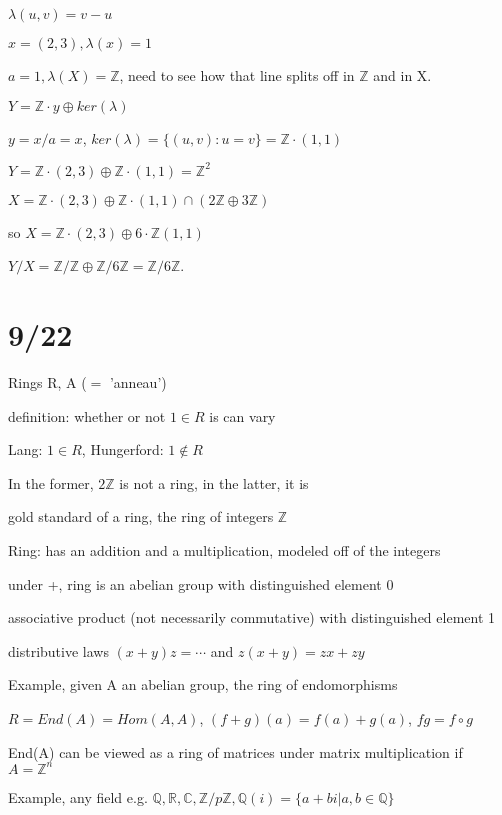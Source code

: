\documentclass[12pt]{article}
\begin{document}
$\lambda(u, v) = v - u$

$x = (2, 3), \lambda(x) = 1$

$a = 1, \lambda(X) = \mathds{Z}$, need to see how that line splits off in $\mathds{Z}$ and in X.

$Y = \mathds{Z}\cdot y \oplus ker(\lambda)$

$y = x/a = x$, $ker(\lambda) = \{(u, v) : u = v\} = \mathds{Z} \cdot (1, 1)$

$Y = \mathds{Z} \cdot (2, 3) \oplus \mathds{Z} \cdot (1, 1) = \mathds{Z}^2$

$X = \mathds{Z} \cdot (2, 3) \oplus \mathds{Z} \cdot (1, 1) \cap (2\mathds{Z} \oplus 3\mathds{Z})$

so $X = \mathds{Z} \cdot (2, 3) \oplus 6 \cdot \mathds{Z}(1, 1)$

$Y/X = \mathds{Z}/\mathds{Z} \oplus \mathds{Z}/6\mathds{Z} = \mathds{Z}/6\mathds{Z}$.

\section{9/22}

Rings R, A ($=$ 'anneau')

definition: whether or not $1 \in R$ is can vary

Lang: $1 \in R$, Hungerford: $1 \not \in R$

In the former, $2\mathds{Z}$ is not a ring, in the latter, it is

gold standard of a ring, the ring of integers $\mathds{Z}$

\noindent
Ring: has an addition and a multiplication, modeled off of the integers

under +, ring is an abelian group with distinguished element 0

associative product (not necessarily commutative) with distinguished element 1

distributive laws $(x + y)z = \cdots$ and $z(x + y) = zx + zy$

\noindent
Example, given A an abelian group, the ring of endomorphisms

$R = End(A) = Hom(A, A)$, $(f + g)(a) = f(a) + g(a)$, $fg = f \circ g$

End(A) can be viewed as a ring of matrices under matrix multiplication if $A = \mathds{Z}^n$

\noindent
Example, any field e.g. $\mathds{Q}, \mathds{R}, \mathds{C}, \mathds{Z}/p\mathds{Z}, \mathds{Q}(i) = \{a + bi | a, b \in \mathds{Q}\}$
\end{document}
